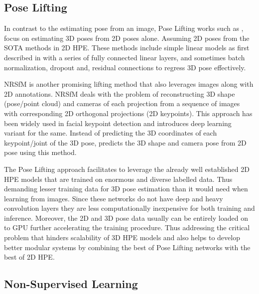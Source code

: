 \subsection{Pose Lifting}

In contrast to the estimating pose from an image, Pose Lifting works such as \cite{poselifter,  amazon1, repnet, c3dpo, unsupervisedAdversarial}, focus on estimating 3D poses from 2D poses alone. Assuming 2D poses from the \ac{SOTA} methods in 2D \ac{HPE}. These methods include simple linear models as first described in \cite{MartinezHRL17} with a series of fully connected linear layers, and sometimes batch normalization, dropout and, residual connections to regress 3D pose effectively.

\ac{NRSfM} is another promising lifting method that also leverages images along with 2D annotations. \ac{NRSfM} deals with the problem of reconstructing 3D shape (pose/point cloud) and cameras of each projection from a sequence of images with corresponding 2D orthogonal projections (2D keypoints). This approach has been widely used in facial keypoint detection and \cite{deepNRSFM} introduces deep learning variant for the same. Instead of predicting the 3D coordinates of each keypoint/joint of the 3D pose, \cite{DistillNRSfM, c3dpo, deepNRSFM, nrsfm++} predicts the 3D shape and camera pose from 2D pose using this method.

The Pose Lifting approach facilitates to leverage the already well established 2D \ac{HPE} models that are trained on enormous and diverse labelled data. Thus demanding lesser training data for 3D pose estimation than it would need when learning from images. Since these networks do not have deep and heavy convolution layers they are less computationally inexpensive for both training and inference. Moreover, the 2D and 3D pose data usually can be entirely loaded on to GPU further accelerating the training procedure. Thus addressing the critical problem that hinders scalability of 3D \ac{HPE} models and also helps to develop better modular systems by combining the best of Pose Lifting networks with the best of 2D \ac{HPE}.

\subsection{Non-Supervised Learning}

